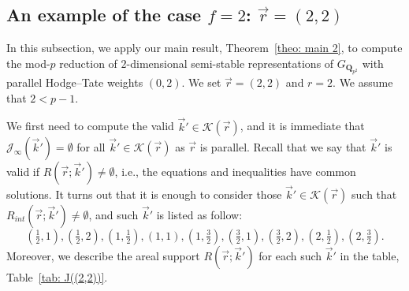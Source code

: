 \documentclass[11pt]{amsart}
\theoremstyle{definition}
\numberwithin{equation}{subsection}
\theoremstyle{plain}
\theoremstyle{plain}
\theoremstyle{plain}
\theoremstyle{plain}
\theoremstyle{plain}
\theoremstyle{plain}
\theoremstyle{plain}
\theoremstyle{plain}
\theoremstyle{plain}
\theoremstyle{plain}
\theoremstyle{plain}
\theoremstyle{plain}
\theoremstyle{definition}
\theoremstyle{definition}
\theoremstyle{definition}
\theoremstyle{remark}
\renewcommand{\(}{\textup{(}}
\renewcommand{\)}{\textup{)}}
\newcommand{\Q}{\mathbf{Q}}
\newcommand{\cJ}{\mathcal{J}}
\newcommand{\vr}{\vec{r}}
\newcommand{\vk}{\vec{k}}
\newcommand{\cK}{\mathcal{K}}
\begin{document}
\subsection{An example of the case $f=2$: $\vr=(2,2)$}
In this subsection, we apply our main result, Theorem~\ref{theo: main 2}, to compute the mod-$p$ reduction of $2$-dimensional semi-stable representations of $G_{\Q_{p^2}}$ with parallel Hodge--Tate weights $(0,2)$. We set $\vr=(2,2)$ and $r=2$. We assume that $2<p-1$.

We first need to compute the valid $\vk'\in\cK(\vr)$, and it is immediate that $\cJ_\infty(\vk')=\emptyset$ for all $\vk'\in\cK(\vr)$ as $\vr$ is parallel. Recall that we say that $\vk'$ is valid if $R(\vr;\vk')\neq\emptyset$, i.e., the equations and inequalities have common solutions. It turns out that it is enough to consider those $\vk'\in\cK(\vr)$ such that $R_{int}(\vr;\vk')\neq\emptyset$, and such $\vk'$ is listed as follow:
$$(\tfrac{1}{2},1),(\tfrac{1}{2},2),(1,\tfrac{1}{2}),(1,1),(1,\tfrac{3}{2}), (\tfrac{3}{2},1),(\tfrac{3}{2},2),(2,\tfrac{1}{2}),(2,\tfrac{3}{2}).$$
Moreover, we describe the areal support $R(\vr;\vk')$ for each such $\vk'$ in the table, Table~\ref{tab: J((2,2))}.
\end{document}

